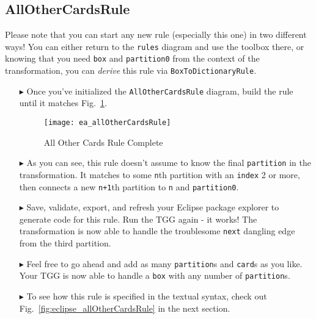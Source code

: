 \newpage
\hypertarget{allCards vis}{}
\subsection{AllOtherCardsRule}
\visHeader

Please note that you can start any new rule (especially this one) in two different ways! You can either return to the \texttt{rules} diagram and use the toolbox
there, or knowing that you need \texttt{box} and \texttt{partition0} from the context of the transformation, you can \emph{derive} this rule via
\texttt{BoxToDictionaryRule}.

\begin{itemize}

\item[$\blacktriangleright$] Once you've initialized the \texttt{AllOtherCardsRule} diagram, build the rule until it matches
Fig.~\ref{fig:ea_allOtherCardsRule}.

\begin{figure}[htbp]
\begin{center}
  \texttt{[image: ea\_allOtherCardsRule]}
  \caption{All Other Cards Rule Complete}
  \label{fig:ea_allOtherCardsRule}
\end{center}
\end{figure}

\item[$\blacktriangleright$] As you can see, this rule doesn't assume to know the final \texttt{partition} in the transformation. It matches to some
\texttt{n}th partition with an \texttt{index} 2 or more, then connects a new \texttt{n+1}th partition to \texttt{n} and \texttt{partition0}. 

\item[$\blacktriangleright$] Save, validate, export, and refresh your Eclipse package explorer to generate code for this rule. Run the TGG again - it works! The
transformation is now able to handle the troublesome \texttt{next} dangling edge from the third partition.

\item[$\blacktriangleright$] Feel free to go ahead and add as many \texttt{partition}s and \texttt{card}s as you like. Your TGG is now able to handle a
\texttt{box} with any number of \texttt{partition}s. 

\item[$\blacktriangleright$] To see how this rule is specified in the textual syntax, check out Fig.~\ref{fig:eclipse_allOtherCardsRule} in the next section.

\end{itemize}
